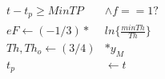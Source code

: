 \documentclass[10pt]{article}
\begin{document}
\begin{align*}t-t_p \geq MinTP &\wedge f ==1 ?\\
eF \leftarrow (-1/3)  * & ln\{\frac{minTh}{Th}\}\\
Th,Th_{o}\leftarrow (3/4) &*y_{M} \\
t_{p} &\leftarrow t\end{align*}
\end{document}
